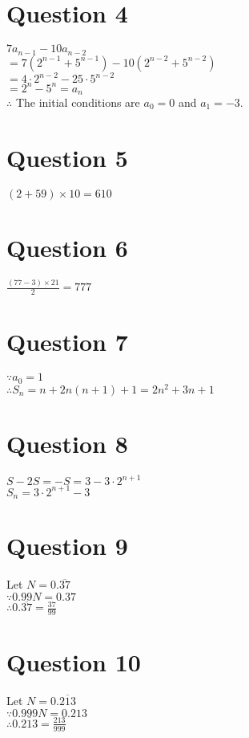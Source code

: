 \documentclass[11pt, oneside]{article}   	%
\begin{document}
\section*{Question 4}

	$7a_{n-1}-10a_{n-2}$\\
	$=7(2^{n-1}+5^{n-1})-10(2^{n-2}+5^{n-2})$\\
	$=4\cdot 2^{n-2}-25\cdot 5^{n-2}$\\
	$=2^{n}-5^{n}=a_{n}$\\
	$\therefore$ The initial conditions are $a_{0}=0$ and $a_{1}=-3$.

\section*{Question 5}

	$(2+59)\times 10=610$


\section*{Question 6}

	$\frac{(77-3)\times 21}{2}=777$

\section*{Question 7}

	$\because a_{0}=1$\\
	$\therefore S_{n}=n+2n(n+1)+1=2n^{2}+3n+1$

\section*{Question 8}

	$S-2S=-S=3-3\cdot 2^{n+1}$\\
	$S_{n}=3\cdot 2^{n+1}-3$

\section*{Question 9}

	Let $N=0.\overline{37}$\\
	$\because 0.99N=0.37$\\
	$\therefore 0.\overline{37}=\frac{37}{99}$

\section*{Question 10}

	Let $N=0.\overline{213}$\\
	$\because 0.999N=0.213$\\
	$\therefore 0.\overline{213}=\frac{213}{999}$
\end{document}
